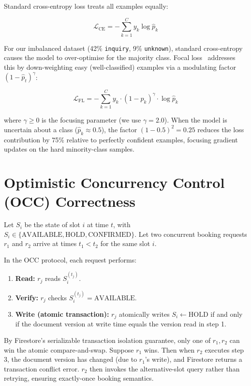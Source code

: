 Standard cross-entropy loss treats all examples equally:

\begin{equation}
  \mathcal{L}_{\text{CE}} = -\sum_{k=1}^{C} y_k \log \hat{p}_k
  \label{eq:ce-loss}
\end{equation}

For our imbalanced dataset (42\% \texttt{inquiry}, 9\% \texttt{unknown}), standard
cross-entropy causes the model to over-optimise for the majority class.  Focal
loss~\cite{an2022} addresses this by down-weighting easy (well-classified) examples
via a modulating factor $(1 - \hat{p}_t)^\gamma$:

\begin{equation}
  \mathcal{L}_{\text{FL}} = -\sum_{k=1}^{C} y_k \cdot (1 - \hat{p}_k)^\gamma \cdot \log \hat{p}_k
  \label{eq:focal-loss}
\end{equation}

\noindent where $\gamma \geq 0$ is the focusing parameter (we use $\gamma = 2.0$).
When the model is uncertain about a class ($\hat{p}_k \approx 0.5$), the factor
$(1 - 0.5)^2 = 0.25$ reduces the loss contribution by 75\% relative to perfectly
confident examples, focusing gradient updates on the hard minority-class samples.

\section{Optimistic Concurrency Control (OCC) Correctness}
\label{app:math-occ}

Let $S_i$ be the state of slot $i$ at time $t$, with $S_i \in \{\text{AVAILABLE},
\text{HOLD}, \text{CONFIRMED}\}$.  Let two concurrent booking requests $r_1$ and
$r_2$ arrive at times $t_1 < t_2$ for the same slot $i$.

In the OCC protocol, each request performs:
\begin{enumerate}
  \item \textbf{Read:} $r_j$ reads $S_i^{(t_j)}$.
  \item \textbf{Verify:} $r_j$ checks $S_i^{(t_j)} = \text{AVAILABLE}$.
  \item \textbf{Write (atomic transaction):} $r_j$ atomically writes
        $S_i \leftarrow \text{HOLD}$ if and only if the document version at write
        time equals the version read in step 1.
\end{enumerate}

By Firestore's serializable transaction isolation guarantee, only one of $r_1, r_2$
can win the atomic compare-and-swap.  Suppose $r_1$ wins.  Then when $r_2$ executes
step 3, the document version has changed (due to $r_1$'s write), and Firestore
returns a transaction conflict error.  $r_2$ then invokes the alternative-slot
query rather than retrying, ensuring exactly-once booking semantics.

